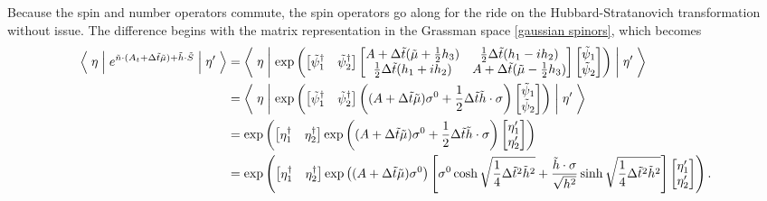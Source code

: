 Because the spin and number operators commute, the spin operators go along for the ride on the Hubbard-Stratanovich transformation without issue.
The difference begins with the matrix representation in the Grassman space \eqref{gaussian spinors}, which becomes
\begin{align}
	\left\langle\;\eta\;\middle|\; e^{\tilde{n} \cdot (A_t + \Delta\tilde{t} \tilde{\mu}) + \tilde{h} \cdot \tilde{S}} \;\middle|\;\eta'\;\right\rangle
	&=
		\left\langle\;\eta\;\middle|\; \exp\left(
			\begin{bmatrix} \tilde{\psi}^{\dagger}_{1} &  \tilde{\psi}^{\dagger}_{2}  \end{bmatrix} 
			\begin{bmatrix}
				A + \Delta \tilde{t} (\tilde{\mu} + \frac{1}{2} h_3)	& \frac{1}{2} \Delta\tilde{t}(h_1 - i h_2) \\
				\frac{1}{2} \Delta\tilde{t}(h_1 + i h_2) 				& A +\Delta \tilde{t} (\tilde{\mu} - \frac{1}{2} h_3)
			\end{bmatrix} 
			\begin{bmatrix} \tilde{\psi}_{1} \\  \tilde{\psi}_{2}  \end{bmatrix}
		\right) \;\middle|\;\eta'\;\right\rangle
	\nonumber\\
	&=
		\left\langle\;\eta\;\middle|\; \exp\left(
			\begin{bmatrix} \tilde{\psi}^{\dagger}_{1} &  \tilde{\psi}^{\dagger}_{2}  \end{bmatrix} 
			\left( (A+\Delta\tilde{t}\tilde{\mu}) \sigma^0 + \frac{1}{2} \Delta\tilde{t}\tilde{h}\cdot\sigma\right)
			\begin{bmatrix} \tilde{\psi}_{1} \\  \tilde{\psi}_{2}  \end{bmatrix}
		\right) \;\middle|\;\eta'\;\right\rangle
	\nonumber\\
	&=
		\exp\left(
			\begin{bmatrix} \eta^{\dagger}_{1} &  \eta^{\dagger}_{2}  \end{bmatrix} 
			\exp\left( (A+\Delta\tilde{t}\tilde{\mu}) \sigma^0 + \frac{1}{2} \Delta\tilde{t}\tilde{h}\cdot\sigma\right)
			\begin{bmatrix} \eta'_{1} \\  \eta'_{2}  \end{bmatrix}
		\right)
	\nonumber\\
	&=
		\exp\left(
			\begin{bmatrix} \eta^{\dagger}_{1} &  \eta^{\dagger}_{2}  \end{bmatrix} 
			\exp\left( (A+\Delta\tilde{t}\tilde{\mu}) \sigma^0 \right) 
			\left[\sigma^0 \cosh \sqrt{\frac{1}{4}\Delta \tilde{t}^2 \tilde{h}^2} + \frac{\tilde{h} \cdot \sigma}{\sqrt{h^2}} \sinh \sqrt{\frac{1}{4}\Delta\tilde{t}^2 \tilde{h}^2}  \right]
			\begin{bmatrix} \eta'_{1} \\  \eta'_{2}  \end{bmatrix}
		\right).
\end{align}
